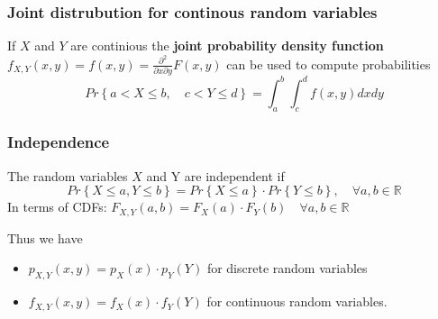 \documentclass{article}
\theoremstyle{remark}
\begin{document}
\subsubsection{Joint distrubution for continous random variables}%
\label{ssub:joint_distrobution_for_continous_random_variables}

If $X$ and $Y$ are continious the \textbf{joint probability density function}  $f_{X,Y} \left( x,y \right) = f\left( x,y \right) = \frac{\partial ^2}{\partial x \partial y } F\left( x,y \right)   $ can be used to compute probabilities \[
Pr\left\{ a < X \le b,  \quad  c < Y \le d  \right\} = \int_{a}^{b} \int_{c}^{d} f\left( x,y \right)dxdy    
\] 

\subsubsection{Independence}%
\label{ssub:independence}

The random variables $X$ and Y are independent if \[
Pr\left\{ X \le a , Y \le b \right\} =  Pr\left\{ X \le a \right\} \cdot  Pr\left\{ Y \le b \right\}, \quad  \forall a,b \in  \mathbb{R}  
\] 
In terms of CDFs:  $F_{X,Y}(a,b ) =  F_{X}\left( a \right)\cdot F_{Y}\left( b \right) \quad  \forall a,b \in \mathbb{R}  $
\par
Thus we have 
\begin{itemize}
  \item $p_{X,Y} \left( x,y \right) = p_{X}\left( x \right) \cdot  p_{Y}\left( Y \right)$ for discrete random variables
  \item $f_{X,Y}\left( x,y \right) = f_{X}\left( x \right) \cdot  f_{Y}\left( Y \right)$ for continuous random variables.
\end{itemize}






 
 
 










\end{document}

